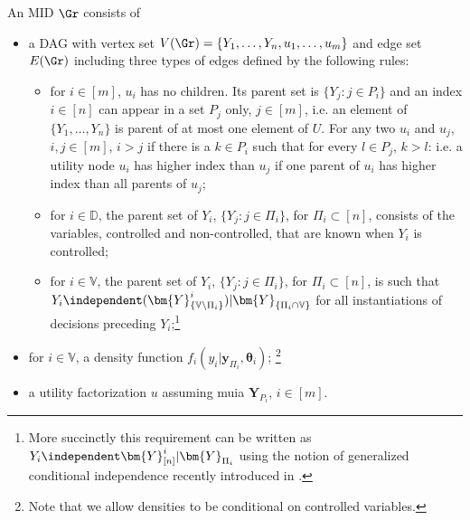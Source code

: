 \begin{definition}
\label{def:MID}
An  \gls{MID} $\Gr$  consists of
\begin{itemize}
\item a \gls{DAG} with vertex set $V(\Gr)=\{Y_1,\dots,Y_n,u_1,\dots, u_m\}$ and edge set $E(\Gr)$ including three types of edges defined by the following rules:
\begin{itemize}
\item for $i\in [m]$, $u_i$ has no children. Its parent set is $\{Y_j: j\in P_i\}$ and an index $i\in[n]$ can appear in a set $P_j$ only, $j\in[m]$, i.e. an element of $\{Y_1,\dots, Y_n\}$ is parent of at most one element of $U$. For any two $u_i$ and $u_j$, $i,j\in[m]$, $i>j$ if there is a $k\in P_i$ such that for every $l\in P_j$, $k>l$: i.e. a utility node $u_i$ has higher index than $u_j$ if one parent of $u_i$ has higher index than all parents of $u_j$;
\item for $i\in\mathbb{D}$, the parent set of $Y_i$, $\{Y_j: j\in \Pi_i\}$, for $\Pi_i\subset[n]$, consists of the variables, controlled and non-controlled, that are known when $Y_i$ is controlled;
\item for $i\in \mathbb{V}$, the parent set of $Y_i$,  $\{Y_j: j\in \Pi_i\}$, for $\Pi_i\subset[n]$, is such that $
Y_i \independent (\bm{Y}^i_{\{\mathbb{V}\setminus \Pi_i\}})| \bm{Y}_{\{\Pi_i\cap\mathbb{V}\}}$
for all instantiations of decisions preceding $Y_i$;\footnote{More succinctly this requirement can be written as $Y_i\independent \bm{Y}^{i}_{[n]}|\bm{Y}_{\Pi_i}$ using the notion of generalized conditional independence recently introduced in \cite{Dawid2014}.}
\end{itemize}
\item for $i\in\mathbb{V}$, a  density function $f_i(y_i|\bm{y}_{\Pi_i},\bm{\theta}_i)$; \footnote{Note that we allow densities to be conditional on controlled variables.}
\item a utility factorization $u$ assuming \gls{muia} $\bm{Y}_{P_i}$, $i\in[m]$.
\end{itemize}
\end{definition} 

